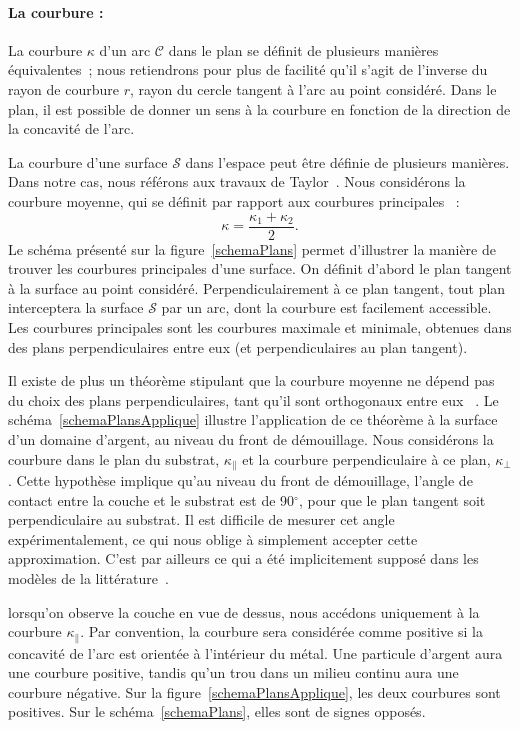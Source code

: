 {{\paragraph*{La courbure :} La courbure $\kappa$ d’un arc $\mathcal{C}$ dans le plan se définit de plusieurs manières équivalentes~; nous retiendrons pour plus de facilité qu’il s’agit de l’inverse du rayon de courbure $r$, rayon du cercle tangent à l’arc au point considéré. Dans le plan, il est possible de donner un sens à la courbure en fonction de la direction de la concavité de l’arc.\par 
La courbure d’une surface $\mathcal{S}$ dans l’espace peut être définie de plusieurs manières. Dans notre cas, nous référons aux travaux de Taylor~\cite{taylor1992ii}. Nous considérons la courbure moyenne, qui se définit par rapport aux \og courbures principales \fg~:
\begin{equation}
\kappa = \dfrac{\kappa_1+\kappa_2}{2}.
\label{eCourb}
\end{equation}
Le schéma présenté sur la figure~\ref{schemaPlans} permet d’illustrer la manière de trouver les courbures principales d’une surface. On définit d’abord le plan tangent à la surface au point considéré. Perpendiculairement à ce plan tangent, tout plan interceptera la surface $\mathcal{S}$ par un arc, dont la courbure est facilement accessible. Les courbures principales sont les courbures maximale et minimale, obtenues dans des plans perpendiculaires entre eux (et perpendiculaires au plan tangent).\par
Il existe de plus un théorème stipulant que la courbure moyenne ne dépend pas du choix des plans perpendiculaires, tant qu’il sont orthogonaux entre eux ~\cite{taylor1992ii}. Le schéma~\ref{schemaPlansApplique} illustre l’application de ce théorème à la surface d'un domaine d’argent, au niveau du front de démouillage. Nous considérons la courbure dans le plan du substrat, $\kappa_\parallel$ et la courbure perpendiculaire à ce plan, $\kappa_\perp$. Cette hypothèse implique qu’au niveau du front de démouillage, l’angle de contact entre la couche et le substrat est de 90$^\circ$, pour que le plan tangent soit perpendiculaire au substrat. Il est difficile de mesurer cet angle expérimentalement, ce qui nous oblige à simplement accepter cette approximation. C’est par ailleurs ce qui a été implicitement supposé dans les modèles de la littérature~\cite{brandon1966mobility, jiran1990capillary}.\par 
lorsqu’on observe la couche en vue de dessus, nous accédons uniquement à la courbure $\kappa_\parallel$. Par convention, la courbure sera considérée comme positive si la concavité de l’arc est orientée à l’intérieur du métal. Une particule d’argent aura une courbure positive, tandis qu’un trou dans un milieu continu aura une courbure négative. Sur la figure~\ref{schemaPlansApplique}, les deux courbures sont positives. Sur le schéma~\ref{schemaPlans}, elles sont de signes opposés.\par 

}}
